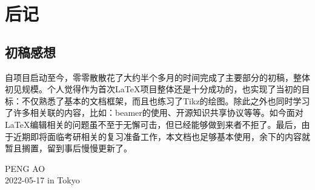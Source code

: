 
\chapter{后记}

\section*{初稿感想}
自项目启动至今，零零散散花了大约半个多月的时间完成了主要部分的初稿，整体初见规模。个人觉得作为首次\LaTeX 项目整体还是十分成功的，也实现了当初的目标：不仅熟悉了基本的文档框架，而且也练习了Tikz的绘图。除此之外也同时学习了许多相关联的内容，比如：beamer的使用、开源知识共享协议等等。如今面对\LaTeX 编辑相关的问题虽不至于无懈可击，但已经能够做到来者不拒了。最后，由于近期即将面临考研相关的复习准备工作，本文档也足够基本使用，余下的内容就暂且搁置，留到事后慢慢更新了。

\begin{flushright}
    PENG AO\\
    2022-05-17 in Tokyo
\end{flushright}

